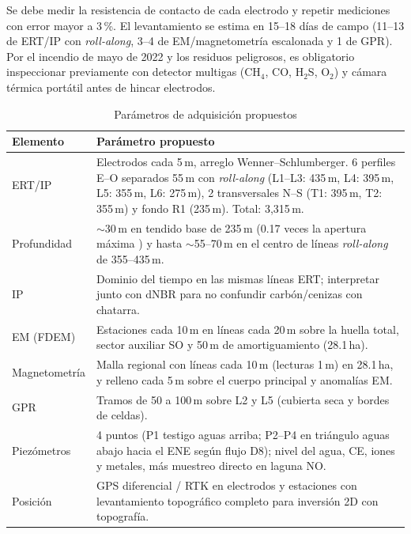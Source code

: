 Se debe medir la resistencia de contacto de cada electrodo y repetir mediciones con error mayor a 3\,\%. El levantamiento se estima en 15--18 días de campo (11--13 de ERT/IP con \emph{roll-along}, 3--4 de EM/magnetometría escalonada y 1 de GPR). Por el incendio de mayo de 2022 y los residuos peligrosos, es obligatorio inspeccionar previamente con detector multigas (CH$_4$, CO, H$_2$S, O$_2$) y cámara térmica portátil antes de hincar electrodos.

\begin{table}[!t]
\caption{Parámetros de adquisición propuestos}
\label{tab:par}
\centering
\small
\begin{tabular}{@{}p{}p{}@{}}
\toprule
Elemento & Parámetro propuesto\\
\midrule
ERT/IP & Electrodos cada 5\,m, arreglo Wenner--Schlumberger. 6 perfiles E--O separados 55\,m con \emph{roll-along} (L1--L3: 435\,m, L4: 395\,m, L5: 355\,m, L6: 275\,m), 2 transversales N--S (T1: 395\,m, T2: 355\,m) y fondo R1 (235\,m). Total: 3,315\,m.\\
Profundidad & $\sim$30\,m en tendido base de 235\,m (0.17 veces la apertura máxima \cite{edwards1977}) y hasta $\sim$55--70\,m en el centro de líneas \emph{roll-along} de 355--435\,m.\\
IP & Dominio del tiempo en las mismas líneas ERT; interpretar junto con dNBR para no confundir carbón/cenizas con chatarra.\\
EM (FDEM) & Estaciones cada 10\,m en líneas cada 20\,m sobre la huella total, sector auxiliar SO y 50\,m de amortiguamiento (28.1\,ha).\\
Magnetometría & Malla regional con líneas cada 10\,m (lecturas 1\,m) en 28.1\,ha, y relleno cada 5\,m sobre el cuerpo principal y anomalías EM.\\
GPR & Tramos de 50 a 100\,m sobre L2 y L5 (cubierta seca y bordes de celdas).\\
Piezómetros & 4 puntos (P1 testigo aguas arriba; P2--P4 en triángulo aguas abajo hacia el ENE según flujo D8); nivel del agua, CE, iones y metales, más muestreo directo en laguna NO.\\
Posición & GPS diferencial / RTK en electrodos y estaciones con levantamiento topográfico completo para inversión 2D con topografía.\\
\bottomrule
\end{tabular}
\end{table}

